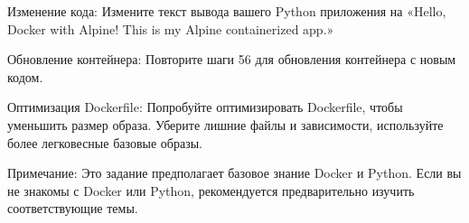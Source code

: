 \documentclass[letterpaper,10pt,russian]{sphinxmanual}
\begin{document}
\sphinxAtStartPar
Изменение кода: Измените текст вывода вашего Python приложения на «Hello, Docker with Alpine! This is my Alpine containerized app.»

\sphinxAtStartPar
Обновление контейнера: Повторите шаги 5\sphinxhyphen{}6 для обновления контейнера с новым кодом.

\sphinxAtStartPar
Оптимизация Dockerfile: Попробуйте оптимизировать Dockerfile, чтобы уменьшить размер образа. Уберите лишние файлы и зависимости, используйте более легковесные базовые образы.

\sphinxAtStartPar
Примечание: Это задание предполагает базовое знание Docker и Python. Если вы не знакомы с Docker или Python, рекомендуется предварительно изучить соответствующие темы.

\sphinxstepscope
\end{document}
